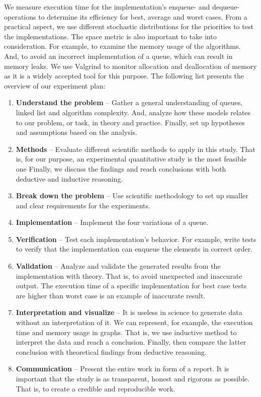 \documentclass[a4paper,11pt]{kth-mag}
\newcommand*{\skippara}{\par\vspace{\baselineskip} \noindent}
\begin{document}
\skippara We measure execution time for the implementation's enqueue- and dequeue-operations to determine its efficiency for best, average and worst cases.
From a practical aspect, we use different stochastic distributions for the priorities to test the implementations.
The space metric is also important to take into consideration.
For example, to examine the memory usage of the algorithms.
And, to avoid an incorrect implementation of a queue, which can result in memory leaks.
We use Valgrind to monitor allocation and deallocation of memory as it is a widely accepted tool for this purpose.
The following list presents the overview of our experiment plan:
\begin{enumerate}
    \item \textbf{Understand the problem} -- Gather a general understanding of queues, linked list and algorithm complexity.
        And, analyze how these models relates to our problem, or task, in theory and practice.
        Finally, set up hypotheses and assumptions based on the analysis.
    \item \textbf{Methods} -- Evaluate different scientific methods to apply in this study.
        That is, for our purpose, an experimental quantitative study is the most feasible one
        Finally, we discuss the findings and reach conclusions with both deductive and inductive reasoning.
    \item \textbf{Break down the problem} -- Use scientific methodology to set up smaller and clear requirements for the experiments.
    \item \textbf{Implementation} -- Implement the four variations of a queue.
    \item \textbf{Verification} -- Test each implementation's behavior.
        For example, write tests to verify that the implementation can enqueue the elements in correct order.
    \item \textbf{Validation} -- Analyze and validate the generated results from the implementation with theory.
        That is, to avoid unexpected and inaccurate output.
        The execution time of a specific implementation for best case tests are higher than worst case is an example of inaccurate result.
    \item \textbf{Interpretation and visualize} -- It is useless in science to generate data without an interpretation of it.
        We can represent, for example, the execution time and memory usage in graphs.
        That is, we use inductive method to interpret the data and reach a conclusion.
        Finally, then compare the latter conclusion with theoretical findings from deductive reasoning.
    \item \textbf{Communication} -- Present the entire work in form of a report.
        It is important that the study is as transparent, honest and rigorous as possible.
        That is, to create a credible and reproducible work.
\end{enumerate}
\end{document}
